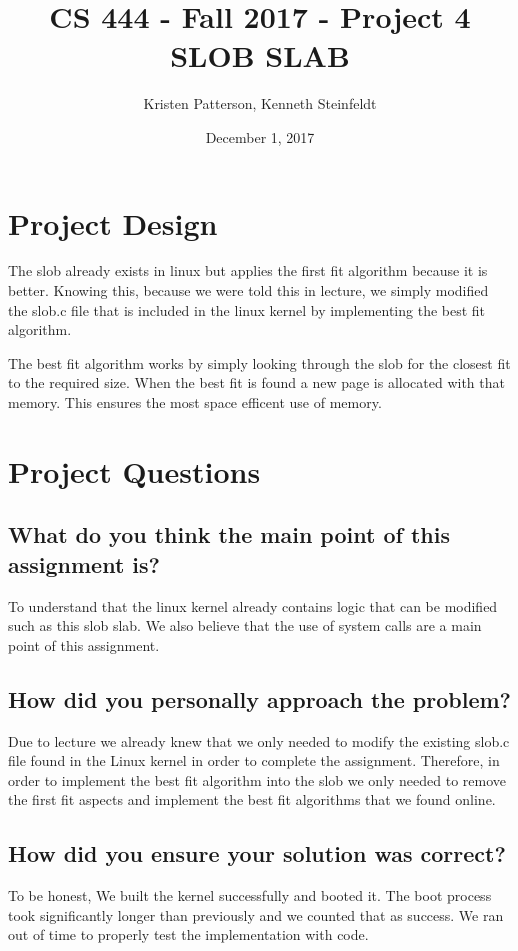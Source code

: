 \documentclass[10pt,letterpaper,onecolumn,draftclsnofoot]{IEEEtran}
\begin{document}
\begin{titlepage}

	\title{CS 444 - Fall 2017 - Project 4 \\ SLOB SLAB}
	\author{Kristen Patterson, Kenneth Steinfeldt}
	\date{December 1, 2017}
	\maketitle
\end{titlepage}

\section{Project Design}
The slob already exists in linux but applies the first fit algorithm because it is better.
Knowing this, because we were told this in lecture, we simply modified the slob.c file that is included in the linux kernel by implementing the best fit algorithm.

The best fit algorithm works by simply looking through the slob for the closest fit to the required size.
When the best fit is found a new page is allocated with that memory.
This ensures the most space efficent use of memory.

\section{Project Questions}
\subsection{What do you think the main point of this assignment is?}
To understand that the linux kernel already contains logic that can be modified such as this slob slab.
We also believe that the use of system calls are a main point of this assignment.

\subsection{How did you personally approach the problem?}
Due to lecture we already knew that we only needed to modify the existing slob.c file found in the Linux kernel in order to complete the assignment.
Therefore, in order to implement the best fit algorithm into the slob we only needed to remove the first fit aspects and implement the best fit algorithms that we found online.

\subsection{How did you ensure your solution was correct?}
To be honest, We built the kernel successfully and booted it.
The boot process took significantly longer than previously and we counted that as success.
We ran out of time to properly test the implementation with code.
\end{document}
